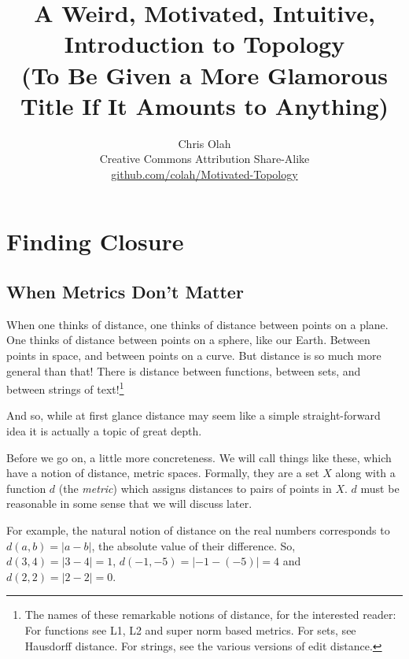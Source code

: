 \documentclass{report}
\begin{document}
\title{A Weird, Motivated, Intuitive, Introduction to Topology\\{\small(To Be Given a More Glamorous Title If It Amounts to Anything)}}
\author{Chris Olah\\ $~$\\ $~$\\ Creative Commons Attribution Share-Alike \\  \href{https://github.com/colah/Motivated-Topology}{github.com/colah/Motivated-Topology}\\ $~$\\}

\maketitle

\tableofcontents

\chapter{Finding Closure}

\section{When Metrics Don't Matter}

When one thinks of distance, one thinks of distance between points on a plane. One thinks of distance between points on a sphere, like our Earth. Between points in space, and between points on a curve. But distance is so much more general than that! There is distance between functions, between sets, and between strings of text!\footnote{The names of these remarkable notions of distance, for the interested reader: For functions see L1, L2 and super norm based metrics. For sets, see Hausdorff distance. For strings, see the various versions of edit distance.}

And so, while at first glance distance may seem like a simple straight-forward idea it is actually a topic of great depth.

Before we go on, a little more concreteness. We will call things like these, which have a notion of distance, metric spaces. Formally, they are a set $X$ along with a function $d$ (the \emph{metric}) which assigns distances to pairs of points in $X$. $d$ must be reasonable in some sense that we will discuss later.

For example, the natural notion of distance on the real numbers corresponds to $d(a,b) = |a-b|$, the absolute value of their difference. So, $d(3,4) = |3-4| = 1$, $d(-1, -5) = |-1-(-5)| = 4$ and $d(2,2) = |2-2| = 0$.
\end{document}
